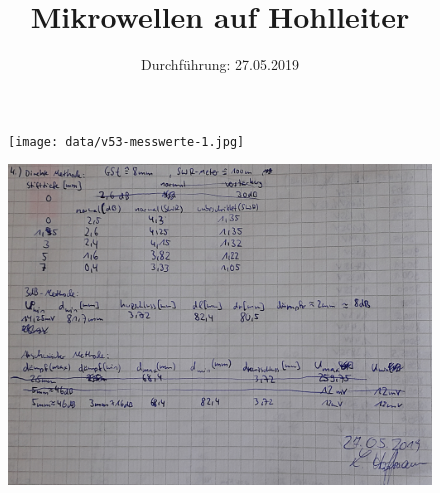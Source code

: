 

\subject{V53}
\title{Mikrowellen auf Hohlleiter}
\date{%
  Durchführung: 27.05.2019
}



\maketitle
\thispagestyle{empty}
\tableofcontents
\newpage





\printbibliography{}
\newpage
{}
\begin{figure}
  \centering
  \texttt{[image: data/v53-messwerte-1.jpg]}
\end{figure}
\begin{figure}
  \centering
  \includegraphics[width=\textwidth]{data/v53-messwerte-2.jpg}
\end{figure}
% 


